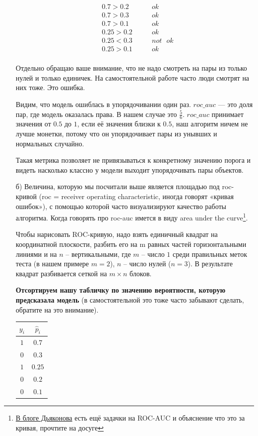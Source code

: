 \documentclass[12pt, a4paper, oneside]{article}
\theoremstyle{plain} %
\theoremstyle{definition}
\newcommand{\indef}[1]{\textbf{ \color{green} #1}}
\begin{document}
\begin{solution}
\begin{enumerate}
	\begin{equation} 
	\begin{aligned}
	& 0.7 > 0.2 \qquad & ok \\
	& 0.7 > 0.3 \qquad & ok \\
	& 0.7 > 0.1 \qquad & ok \\
	& 0.25 > 0.2 \qquad & ok \\ 
	& 0.25 < 0.3 \qquad & not \mbox{ } ok \\
	& 0.25 > 0.1 \qquad & ok \\
	\end{aligned}
	\end{equation} 

    Отдельно обращаю ваше внимание, что не надо смотреть на пары из только нулей и только единичек. На самостоятельной работе часто люди смотрят на них тоже. Это ошибка.

	Видим, что модель ошиблась в упорядочивании один раз. $roc\_auc$ --- это доля пар, где модель оказалась права. В нашем случае это $\frac{5}{6}$. $roc\_auc$ принимает значения от $0.5$ до $1$, если её значения близки к $0.5$, наш алгоритм ничем не лучше монетки, потому что он упорядочивает пары из унывших и нормальных случайно. 

	Такая метрика позволяет не привязываться к конкретному значению порога и видеть насколько классно у модели выходит упорядочивать пары объектов. 

	\item[б)]  Величина, которую мы посчитали выше является площадью под roc-кривой (roc = receiver operating characteristic, иногда говорят «кривая ошибок»), с помощью которой часто визуализируют качество работы алгоритма.  Когда говорять про roc-auc имется в виду area under the curve\footnote{\href{https://dyakonov.org/2017/07/28/}{В блоге Дьяконова} есть ещё задачки на ROC-AUC и объяснение что это за кривая, прочтите на досуге}. 

	Чтобы нарисовать ROC-кривую, надо взять единичный квадрат на координатной плоскости, разбить его на m равных частей горизонтальными линиями и на $n$ – вертикальными, где $m$ – число $1$ среди правильных меток теста (в нашем примере $m=2$), $n$ – число нулей ($n=3$). В результате квадрат разбивается сеткой на $m \times n$ блоков.
	
	\indef{Отсортируем нашу табличку по значению вероятности, которую предсказала модель} (в самостоятельной это тоже часто забывают сделать, обратите на это внимание).
	
	\begin{center}
		\begin{tabular}{c|c}
			$y_i$ & $\hat p_i$ \\
			\hline
			$1$  & $0.7$ \\
			$0$ & $0.3$ \\
			$1$ & $0.25$ \\
			$0$ & $0.2$ \\
			$0$ & $0.1$ \\
		\end{tabular}
	\end{center}
	

\end{enumerate}
\end{solution}
\end{document}
